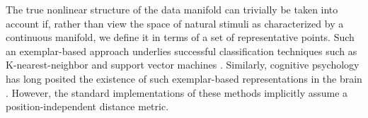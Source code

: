 \documentclass{article} %
\begin{document}



The true nonlinear structure of the data manifold can trivially be taken into account if, rather than view the space of natural stimuli as characterized by a continuous manifold, we define it in terms of a set of representative points.  Such an exemplar-based approach underlies successful classification techniques such as K-nearest-neighbor and support vector machines \cite{bishop2006}.  Similarly, cognitive psychology has long posited the existence of such exemplar-based representations in the brain \cite{reisberg1997}.  However, the standard implementations of these methods implicitly assume a position-independent distance metric.  %
\end{document}
